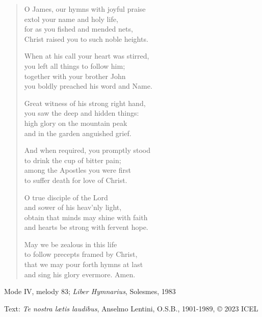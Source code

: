 \hymn

\begin{verse}
O James, our hymns with joyful praise\\
extol your name and holy life,\\
for as you fished and mended nets,\\
Christ raised you to such noble heights.

When at his call your heart was stirred,\\
you left all things to follow him;\\
together with your brother John\\
you boldly preached his word and Name.

Great witness of his strong right hand,\\
you saw the deep and hidden things:\\
high glory on the mountain peak\\
and in the garden anguished grief.

And when required, you promptly stood\\
to drink the cup of bitter pain;\\
among the Apostles you were first\\
to suffer death for love of Christ.

O true disciple of the Lord\\
and sower of his heav’nly light,\\
obtain that minds may shine with faith\\
and hearts be strong with fervent hope.

May we be zealous in this life\\
to follow precepts framed by Christ,\\
that we may pour forth hymns at last\\
and sing his glory evermore. Amen.
\end{verse}

\begin{hymnsource}
Mode IV, melody 83; \emph{Liber Hymnarius}, Solesmes, 1983

Text: \emph{Te nostra lætis laudibus}, Anselmo Lentini, O.S.B., 1901-1989, © 2023 ICEL
\end{hymnsource}
